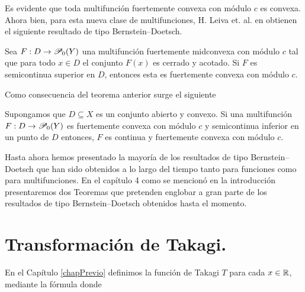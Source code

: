 Es evidente que toda multifunción fuertemente convexa con módulo $c$
es convexa. Ahora bien, para esta nueva clase de multifunciones,
H. Leiva et. al. en \cite{LeiMerNikSan13} obtienen el siguiente
resultado de tipo Bernstein--Doetsch.

\begin{theorem}
Sea $F:D\to\P_0(Y)$ una multifunci\'on fuertemente midconvexa con m\'odulo
$c$ tal que para todo $x\in D$ el conjunto $F(x)$ es cerrado y acotado. Si
$F$ es semicontinua superior en $D$, entonces esta es fuertemente
convexa con m\'odulo $c$.
\end{theorem}   

Como consecuencia del teorema anterior surge el siguiente

\begin{corollary}
Supongamos que $D\subseteq X$ es un conjunto abierto y convexo. Si 
una multifunci\'on $F:D\to\P_0(Y)$ es fuertemente convexa con m\'odulo
$c$ y semicontinua inferior en un punto de $D$ entonces, $F$ es continua
y fuertemente convexa con m\'odulo $c$.
\end{corollary}

Hasta ahora hemos presentado la mayoría de los resultados de tipo Bernstein--Doetsch
que han sido obtenidos a lo largo del tiempo tanto para funciones como para
multifunciones. En el cap\'itulo 4 como se mencion\'o en la introducci\'on 
presentaremos dos Teoremas que pretenden englobar a gran parte de los resultados
de tipo Bernstein--Doetsch obtenidos hasta el momento.


\section{Transformación de Takagi.}

En el Capítulo \ref{chapPrevio} definimos la función de Takagi
$T$ para cada $x\in\R$, mediante la fórmula
donde 

